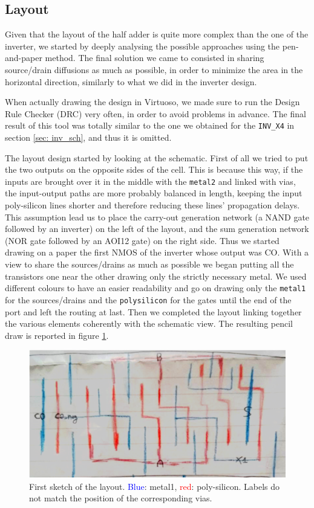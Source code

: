 \documentclass[a4paper]{article}
\newcommand{\inv}{\texttt{INV\_X4}\xspace}
\begin{document}
\subsection{Layout}
Given that the layout of the half adder is quite more complex than the one of the inverter, we started by deeply analysing the possible approaches using the pen-and-paper method. The final solution we came to consisted in sharing source/drain diffusions as much as possible, in order to minimize the area in the horizontal direction, similarly to what we did in the inverter design.

When actually drawing the design in Virtuoso, we made sure to run the Design Rule Checker (DRC) very often, in order to avoid problems in advance. The final result of this tool was totally similar to the one we obtained for the \inv in section \ref{sec: inv_sch}, and thus it is omitted.

The layout design started by looking at the schematic. First of all we tried to put the two outputs on the opposite sides of the cell. This is because this way, if the inputs are brought over it in the middle with the \texttt{metal2} and linked with vias, the input-output paths are more probably balanced in length, keeping the input poly-silicon lines shorter and therefore reducing these lines' propagation delays. This assumption lead us to place the carry-out generation network (a NAND gate followed by an inverter) on the left of the layout, and the sum generation network (NOR gate followed by an AOI12 gate) on the right side.
Thus we started drawing on a paper the first NMOS of the inverter whose output was CO. With a view to share the sources/drains as much as possible we began putting all the transistors one near the other drawing only the strictly necessary metal.
We used different colours to have an easier readability and go on drawing only the \texttt{metal1} for the sources/drains and the \texttt{polysilicon} for the gates until the end of the port and left the routing at last. Then we completed the layout linking together the various elements coherently with the schematic view. The resulting pencil draw is reported in figure \ref{fig: lay_drw}.

\begin{figure}[H]
      \centering
      \includegraphics[width=0.8\linewidth]{./Images/HA/layout_drw.png}
	  \caption{First sketch of the layout. \textcolor{blue}{Blue}: metal1, \textcolor{red}{red}: poly-silicon. Labels do not match the position of the corresponding vias.}
	  \label{fig: lay_drw}
\end{figure}
\end{document}
